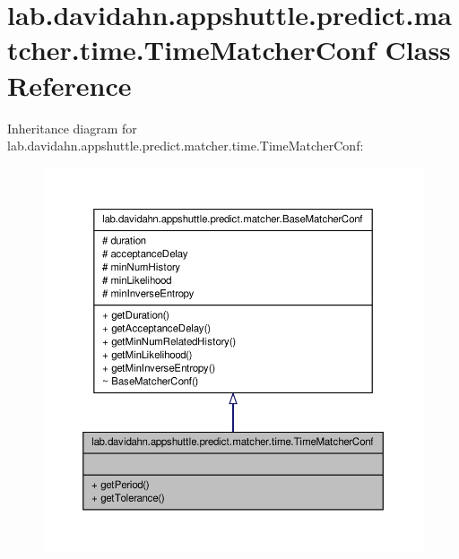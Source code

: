 \hypertarget{classlab_1_1davidahn_1_1appshuttle_1_1predict_1_1matcher_1_1time_1_1_time_matcher_conf}{\section{lab.\-davidahn.\-appshuttle.\-predict.\-matcher.\-time.\-Time\-Matcher\-Conf \-Class \-Reference}
\label{classlab_1_1davidahn_1_1appshuttle_1_1predict_1_1matcher_1_1time_1_1_time_matcher_conf}
}


\-Inheritance diagram for lab.\-davidahn.\-appshuttle.\-predict.\-matcher.\-time.\-Time\-Matcher\-Conf\-:
\nopagebreak
\begin{figure}[H]
\begin{center}
\leavevmode
\includegraphics[width=350pt]{classlab_1_1davidahn_1_1appshuttle_1_1predict_1_1matcher_1_1time_1_1_time_matcher_conf__inherit__graph}
\end{center}
\end{figure}


